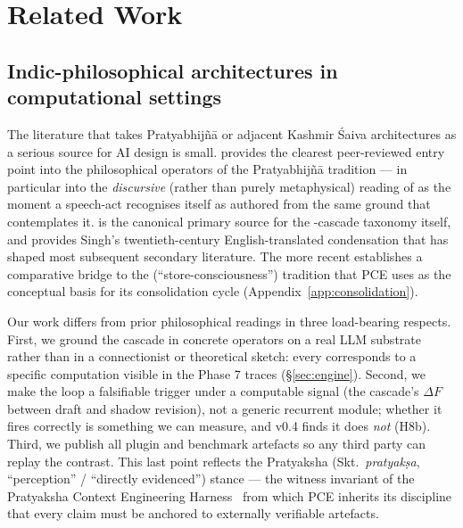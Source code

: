 \section{Related Work}\label{sec:related}

\subsection{Indic-philosophical architectures in computational settings}

The literature that takes Pratyabhij\~n\=a or adjacent Kashmir \'Saiva architectures as a serious source for AI design is small. \citet{Lawrence1996TantricArgumentPEW} provides the clearest peer-reviewed entry point into the philosophical operators of the Pratyabhij\~n\=a tradition --- in particular into the \emph{discursive} (rather than purely metaphysical) reading of  as the moment a speech-act recognises itself as authored from the same ground that contemplates it. \citet{abhinavagupta-isvarapratyabhijna} is the canonical primary source for the -cascade taxonomy itself, and \citet{pratyabhijnahrdayam-singh} provides Singh's twentieth-century English-translated condensation that has shaped most subsequent secondary literature. The more recent \citet{Waldron2003BuddhistUnconscious} establishes a comparative bridge to the  (``store-consciousness'') tradition that PCE uses as the conceptual basis for its consolidation cycle (Appendix~\ref{app:consolidation}).

Our work differs from prior philosophical readings in three load-bearing respects. First, we ground the cascade in concrete operators on a real LLM substrate rather than in a connectionist or theoretical sketch: every  corresponds to a specific computation visible in the Phase 7 traces (\S\ref{sec:engine}). Second, we make the  loop a falsifiable trigger under a computable signal (the cascade's $\Delta F$ between draft and shadow revision), not a generic recurrent module; whether it fires correctly is something we can measure, and v0.4 finds it does \emph{not} (H8b). Third, we publish all plugin and benchmark artefacts so any third party can replay the contrast. This last point reflects the Pratyaksha (Skt.\ \emph{pratyak\d{s}a}, ``perception'' / ``directly evidenced'') stance --- the witness invariant of the Pratyaksha Context Engineering Harness~\citep{PratyakshaContextEng2025} from which PCE inherits its discipline that every claim must be anchored to externally verifiable artefacts.


